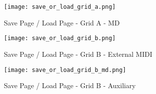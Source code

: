 \begin{figure}
    \centering
    \texttt{[image: save\_or\_load\_grid\_a.png]}
    \caption{Save Page / Load Page - Grid A - MD }
    \label{fig:my_label}
\end{figure}
\begin{figure}
    \centering
    \texttt{[image: save\_or\_load\_grid\_b.png]}
    \caption{Save Page / Load Page - Grid B - External MIDI}
    \label{fig:my_label}
\end{figure}
\begin{figure}
    \centering
    \texttt{[image: save\_or\_load\_grid\_b\_md.png]}
    \caption{Save Page / Load Page - Grid B - Auxiliary}
    \label{fig:my_label}
\end{figure}
